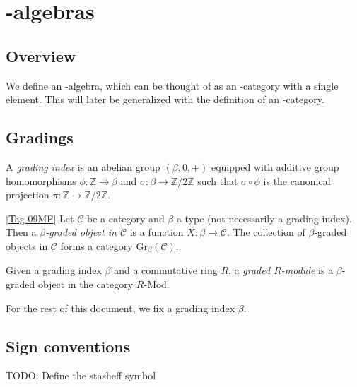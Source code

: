 \chapter{\Ainf{}-algebras}

\section{Overview}

We define an \Ainf{}-algebra, which can be thought of as an \Ainf{}-category with a single element.
This will later be generalized with the definition of an \Ainf{}-category.

\section{Gradings}

\begin{definition}\label{GradingIndex}
  A \emph{grading index} is an abelian group $(\beta,0,+)$ equipped with additive group
  homomorphisms $\phi : \mathbb{Z} \to \beta$ and $\sigma : \beta \to \mathbb{Z}/2\mathbb{Z}$ such
  that $\sigma \circ \phi$ is the canonical projection $\pi : \mathbb{Z} \to \mathbb{Z}/2\mathbb{Z}$.

\end{definition}

\begin{definition}[Mathlib]\label{GradedObject}
  [\href{https://stacks.math.columbia.edu/tag/09MF}{Tag 09MF}]
  Let $\mathcal C$ be a category and $\beta$ a type (not necessarily a grading index).
  Then a \emph{$\beta$-graded object in $\mathcal C$} is a function $X : \beta \to \mathcal C$.
  The collection of $\beta$-graded objects in $\mathcal C$ forms a category $\mathrm{Gr}_\beta(\mathcal C)$.

\end{definition}

\begin{definition}\label{GradedModule}

  Given a grading index $\beta$ and a commutative ring $R$, a \emph{graded $R$-module} is a
  $\beta$-graded object in the category $R\text{-}\mathrm{Mod}$.
\end{definition}

For the rest of this document, we fix a grading index $\beta$.

\section{Sign conventions}

TODO: Define the stasheff symbol
